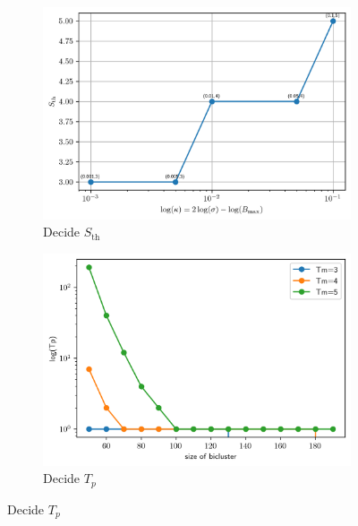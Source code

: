 \documentclass{beamer}
\begin{document}
\begin{frame}
\begin{columns}
\begin{column}{0.5\textwidth}
\begin{figure}[htb]
\begin{subfigure}[b]{\textwidth}
                    \centering
                    \includegraphics[width=\linewidth]{Tm.png}
                    \caption{Decide $S_{\text{th}}$}
                    \label{fig:image1}
                \end{subfigure}
                \begin{subfigure}[b]{\textwidth}
                    \centering
                    \includegraphics[width=\linewidth]{Tp.png}
                    \caption{Decide $T_p$}
                    \label{fig:image2}
                \end{subfigure}
                \vspace{-0.8cm}
            \end{figure}
        \end{column}
    \end{columns}

\end{frame}
\end{document}
